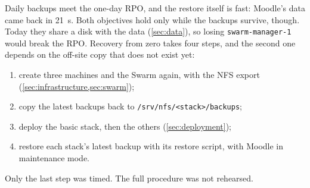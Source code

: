 Daily backups meet the one-day RPO, and the restore itself is fast:
Moodle's data came back in \qty{21}{\second}. Both objectives hold only
while the backups survive, though. Today they share a disk with the data
(\cref{sec:data}), so losing \texttt{swarm-manager-1} would break the
RPO. Recovery from zero takes four steps, and the second one depends on
the off-site copy that does not exist yet:
\begin{enumerate}
  \item create three machines and the Swarm again, with the NFS export
        (\cref{sec:infrastructure,sec:swarm});
  \item copy the latest backups back to \texttt{/srv/nfs/<stack>/backups};
  \item deploy the basic stack, then the others (\cref{sec:deployment});
  \item restore each stack's latest backup with its restore script, with
        Moodle in maintenance mode.
\end{enumerate}
Only the last step was timed. The full procedure was not rehearsed.
